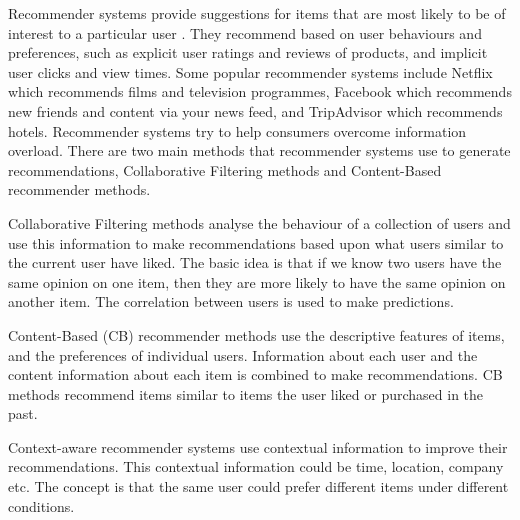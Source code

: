 Recommender systems provide suggestions for items that are most likely to be of interest to a particular user \cite{Ricci2015}. They recommend based on user behaviours and preferences, such as explicit user ratings and reviews of products, and implicit user clicks and view times. Some popular recommender systems include Netflix which recommends films and television programmes, Facebook which recommends new friends and content via your news feed, and TripAdvisor which recommends hotels. Recommender systems try to help consumers overcome information overload. There are two main methods that recommender systems use to generate recommendations, Collaborative Filtering methods and Content-Based recommender methods. 

Collaborative Filtering methods analyse the behaviour of a collection of users and use this information to make recommendations based upon what users similar to the current user have liked. The basic idea is that if we know two users have the same opinion on one item, then they are more likely to have the same opinion on another item. The correlation between users is used to make predictions.

Content-Based (CB) recommender methods use the descriptive features of items, and the preferences of individual users. Information about each user and the content information about each item is combined to make recommendations. CB methods recommend items similar to items the user liked or purchased in the past.

Context-aware recommender systems use contextual information to improve their recommendations. This contextual information could be time, location, company etc. The concept is that the same user could prefer different items under different conditions.

